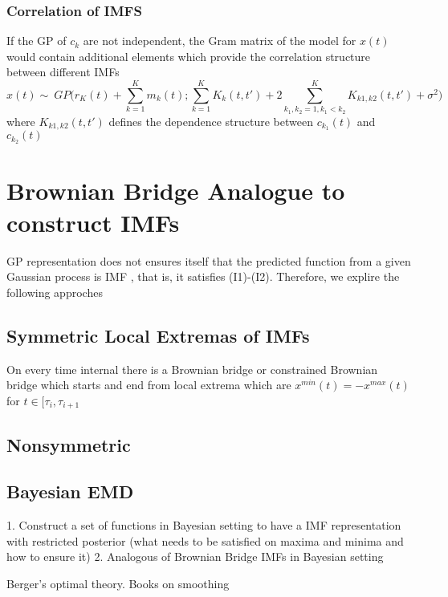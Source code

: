 \documentclass[article,moreauthors,pdftex,10pt,a4paper]{ssrn}
\begin{document}
\subsubsection{Correlation of IMFS }
If the GP of $c_k$ are not independent, the Gram matrix of the model for $x(t)$ would contain additional elements which provide the correlation structure between different IMFs
\begin{equation}
x(t) \sim ~   GP \bigg(r_K(t) + \sum_{k=1}^K m_k(t); \sum_{k=1}^K K_k(t,t') + 2\sum_{k_1,k_2=1, k_1<k_2}^K K_{k1,k2}(t,t') + \sigma^2 \bigg) 
\end{equation}
where $K_{k1,k2}(t,t')$ defines the dependence structure between $c_{k_1}(t)$ and $c_{k_2}(t)$


\section{Brownian Bridge Analogue to  construct IMFs}
GP representation does not ensures itself that the predicted function from a given Gaussian process is IMF , that is, it satisfies (I1)-(I2). Therefore, we explire the following approches



\subsection{Symmetric Local Extremas of IMFs} 
On every time internal there is a Brownian bridge or constrained Brownian bridge which starts and end from local extrema which are $x^{min} (t)= -x^{max}(t)$ for $t \in [\tau_i,\tau_{i+1}$
\subsection{Nonsymmetric}

\subsection{Bayesian EMD}
1. Construct a set of functions in Bayesian setting to have a IMF representation with restricted posterior (what needs to be satisfied on maxima and minima and how to ensure it)
2. Analogous of Brownian Bridge IMFs in Bayesian setting

Berger's optimal theory. Books on smoothing
\end{document}
